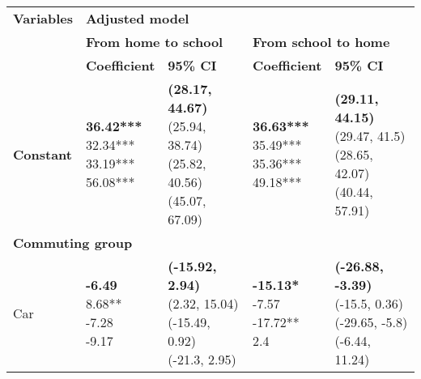 
      \begin{table}
      \begin{center}
      \begin{small}
      \begin{tabular}{lllll}
      \toprule
        \textbf{Variables}
          & \multicolumn{4}{l}{\textbf{Adjusted model}} \\ \cline{2-5}
        & \multicolumn{2}{l}{\textbf{From home to school}} 
          & \multicolumn{2}{l}{\textbf{From school to home}} \\ \cline{2-3} \cline{4-5}
        & \textbf{Coefficient} & \textbf{95\% CI} & \textbf{Coefficient} & \textbf{95\% CI} \\
      \midrule
    \textbf{Constant}    &  \makecell[l]{\textbf{36.42***} \\32.34*** \\33.19*** \\56.08*** \\}   &  \makecell[l]{\textbf{(28.17, 44.67)} \\(25.94, 38.74) \\(25.82, 40.56) \\(45.07, 67.09) \\}   &  \makecell[l]{\textbf{36.63***} \\35.49*** \\35.36*** \\49.18*** \\}   &  \makecell[l]{\textbf{(29.11, 44.15)} \\(29.47, 41.5) \\(28.65, 42.07) \\(40.44, 57.91) \\} \\ 
\multicolumn{5}{l}{\textbf{Commuting group}} \\ 
\quad Car    &  \makecell[l]{\textbf{-6.49} \\8.68** \\-7.28 \\-9.17 \\}   &  \makecell[l]{\textbf{(-15.92, 2.94)} \\(2.32, 15.04) \\(-15.49, 0.92) \\(-21.3, 2.95) \\}   &  \makecell[l]{\textbf{-15.13*} \\-7.57 \\-17.72** \\2.4 \\}   &  \makecell[l]{\textbf{(-26.88, -3.39)} \\(-15.5, 0.36) \\(-29.65, -5.8) \\(-6.44, 11.24) \\} \\ 

\end{tabular}
\end{small}
\end{center}
\end{table}

